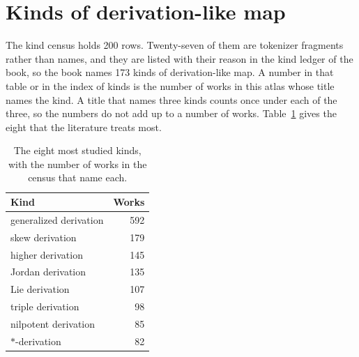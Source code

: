 \section{Kinds of derivation-like map}

The kind census holds 200 rows. Twenty-seven of them are tokenizer %
fragments rather than names, and they are listed with their reason in the %
kind ledger of the book, so the book names 173 kinds of derivation-like map. %
A number in that table or in the index of kinds is the number of works in %
this atlas whose title names the kind. A title that names three kinds counts %
once under each of the three, so the numbers do not add up to a number of works. %
Table~\ref{tab:atlas:kinds} gives the eight that the literature treats most. %

\begin{table}[htbp]
  \centering
  \caption{The eight most studied kinds, with the number of works in the census
  that name each.} %
  \label{tab:atlas:kinds}
  \begin{tabular}{lr}
    \toprule
    Kind & Works \\ %
    \midrule
    generalized derivation & 592 \\ %
    skew derivation        & 179 \\ %
    higher derivation      & 145 \\ %
    Jordan derivation      & 135 \\ %
    Lie derivation         & 107 \\ %
    triple derivation      & 98  \\ %
    nilpotent derivation   & 85  \\ %
    $*$-derivation         & 82  \\ %
    \bottomrule
  \end{tabular}
\end{table}

